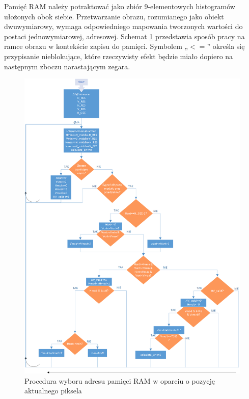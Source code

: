 Pamięć RAM należy potraktować jako zbiór 9-elementowych histogramów ułożonych obok siebie. Przetwarzanie obrazu, rozumianego jako obiekt dwuwymiarowy, wymaga odpowiedniego mapowania tworzonych wartości do postaci jednowymiarowej, adresowej. Schemat \ref{fig:hog_histogram_scheme} przedstawia sposób pracy na ramce obrazu w kontekście zapisu do pamięci. Symbolem „$<=$” określa się przypisanie nieblokujące, które rzeczywisty efekt będzie miało dopiero na następnym zboczu narastającym zegara.
 
\begin{figure}[!ht]
	\centering
	\includegraphics[width=16cm]{4_HOG_Histograms.png}
	\caption{Procedura wyboru adresu pamięci RAM w oparciu o pozycję aktualnego piksela}
	\label{fig:hog_histogram_scheme}
\end{figure} 
 
